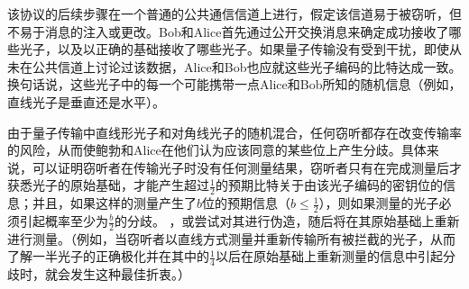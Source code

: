 该协议的后续步骤在一个普通的公共通信信道上进行，假定该信道易于被窃听，但不易于消息的注入或更改。Bob和Alice首先通过公开交换消息来确定成功接收了哪些光子，以及以正确的基础接收了哪些光子。如果量子传输没有受到干扰，即使从未在公共信道上讨论过该数据，Alice和Bob也应就这些光子编码的比特达成一致。换句话说，这些光子中的每一个可能携带一点Alice和Bob所知的随机信息（例如，直线光子是垂直还是水平）。

由于量子传输中直线形光子和对角线光子的随机混合，任何窃听都存在改变传输率的风险，从而使鲍勃和Alice在他们认为应该同意的某些位上产生分歧。具体来说，可以证明窃听者在传输光子时没有任何测量结果，窃听者只有在完成测量后才获悉光子的原始基础，才能产生超过$\frac{1}{2}$的预期比特关于由该光子编码的密钥位的信息；并且，如果这样的测量产生了$b$位的预期信息（$b\leq\frac{1}{2}$），则如果测量的光子必须引起概率至少为$ \frac{b}{2}$的分歧。 ，或尝试对其进行伪造，随后将在其原始基础上重新进行测量。（例如，当窃听者以直线方式测量并重新传输所有被拦截的光子，从而了解一半光子的正确极化并在其中的$\frac{1}{4}$以后在原始基础上重新测量的信息中引起分歧时，就会发生这种最佳折衷。）\textcite{Bennett2014}

